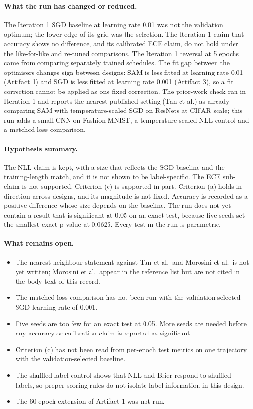 \documentclass[11pt,letterpaper]{article}
\begin{document}
\paragraph{What the run has changed or reduced.} The Iteration 1 SGD baseline at learning rate 0.01 was not the validation optimum; the lower edge of its grid was the selection. The Iteration 1 claim that accuracy shows no difference, and its calibrated ECE claim, do not hold under the like-for-like and re-tuned comparisons. The Iteration 1 reversal at 5 epochs came from comparing separately trained schedules. The fit gap between the optimisers changes sign between designs: SAM is less fitted at learning rate 0.01 (Artifact 1) and SGD is less fitted at learning rate 0.001 (Artifact 3), so a fit correction cannot be applied as one fixed correction. The prior-work check ran in Iteration 1 and reports the nearest published setting (Tan et al.) as already comparing SAM with temperature-scaled SGD on ResNets at CIFAR scale; this run adds a small CNN on Fashion-MNIST, a temperature-scaled NLL control and a matched-loss comparison.

\paragraph{Hypothesis summary.} The NLL claim is kept, with a size that reflects the SGD baseline and the training-length match, and it is not shown to be label-specific. The ECE sub-claim is not supported. Criterion (c) is supported in part. Criterion (a) holds in direction across designs, and its magnitude is not fixed. Accuracy is recorded as a positive difference whose size depends on the baseline. The run does not yet contain a result that is significant at 0.05 on an exact test, because five seeds set the smallest exact p-value at 0.0625. Every test in the run is parametric.

\paragraph{What remains open.}

\begin{itemize}
\item The nearest-neighbour statement against Tan et al.\ and Morosini et al.\ is not yet written; Morosini et al.\ appear in the reference list but are not cited in the body text of this record.
\item The matched-loss comparison has not been run with the validation-selected SGD learning rate of 0.001.
\item Five seeds are too few for an exact test at 0.05. More seeds are needed before any accuracy or calibration claim is reported as significant.
\item Criterion (c) has not been read from per-epoch test metrics on one trajectory with the validation-selected baseline.
\item The shuffled-label control shows that NLL and Brier respond to shuffled labels, so proper scoring rules do not isolate label information in this design.
\item The 60-epoch extension of Artifact 1 was not run.
\end{itemize}
\end{document}
